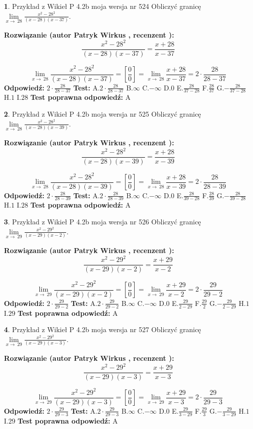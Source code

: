 \documentclass[12pt, a4paper]{article}
\theoremstyle{definition} %
\newtheorem{zad}{}
\newcommand{\zadStart}[1]{\begin{zad}#1\newline}
\newcommand{\zadStop}{\end{zad}}
\newcommand{\rozwStart}[2]{\noindent \textbf{Rozwiązanie (autor #1 , recenzent #2): }\newline}
\newcommand{\rozwStop}{\newline}
\newcommand{\odpStart}{\noindent \textbf{Odpowiedź:}\newline}
\newcommand{\odpStop}{\newline}
\newcommand{\testStart}{\noindent \textbf{Test:}\newline}
\newcommand{\testStop}{\newline}
\newcommand{\kluczStart}{\noindent \textbf{Test poprawna odpowiedź:}\newline}
\newcommand{\kluczStop}{\newline}
\begin{document}
\zadStart{Przykład z Wikieł P 4.2b moja wersja nr 524}
Obliczyć granicę $\lim\limits_{x\to\ 28}\frac{x^{2}-28^{2}}{(x-28)(x-37)}$.
\zadStop
\rozwStart{Patryk Wirkus}{}
$$\frac{x^{2}-28^{2}}{(x-28)(x-37)}=\frac{x+28}{x-37}$$

$$\lim\limits_{x\to\ 28}\frac{x^{2}-28^{2}}{(x-28)(x-37)}=[\frac{0}{0}]=\lim\limits_{x\to\ 28}\frac{x+28}{x-37}=2 \cdot \frac{28}{28-37}$$
\rozwStop
\odpStart
$2 \cdot \frac{28}{28-37}$
\odpStop
\testStart
A.$2 \cdot \frac{28}{28-37}$
B.$\infty$
C.$-\infty$
D.$0$
E.$\frac{28}{37-28}$
F.$\frac{28}{37}$
G.$-\frac{28}{37-28}$
H.$1$
I.$28$
\testStop
\kluczStart
A
\kluczStop



\zadStart{Przykład z Wikieł P 4.2b moja wersja nr 525}
Obliczyć granicę $\lim\limits_{x\to\ 28}\frac{x^{2}-28^{2}}{(x-28)(x-39)}$.
\zadStop
\rozwStart{Patryk Wirkus}{}
$$\frac{x^{2}-28^{2}}{(x-28)(x-39)}=\frac{x+28}{x-39}$$

$$\lim\limits_{x\to\ 28}\frac{x^{2}-28^{2}}{(x-28)(x-39)}=[\frac{0}{0}]=\lim\limits_{x\to\ 28}\frac{x+28}{x-39}=2 \cdot \frac{28}{28-39}$$
\rozwStop
\odpStart
$2 \cdot \frac{28}{28-39}$
\odpStop
\testStart
A.$2 \cdot \frac{28}{28-39}$
B.$\infty$
C.$-\infty$
D.$0$
E.$\frac{28}{39-28}$
F.$\frac{28}{39}$
G.$-\frac{28}{39-28}$
H.$1$
I.$28$
\testStop
\kluczStart
A
\kluczStop



\zadStart{Przykład z Wikieł P 4.2b moja wersja nr 526}
Obliczyć granicę $\lim\limits_{x\to\ 29}\frac{x^{2}-29^{2}}{(x-29)(x-2)}$.
\zadStop
\rozwStart{Patryk Wirkus}{}
$$\frac{x^{2}-29^{2}}{(x-29)(x-2)}=\frac{x+29}{x-2}$$

$$\lim\limits_{x\to\ 29}\frac{x^{2}-29^{2}}{(x-29)(x-2)}=[\frac{0}{0}]=\lim\limits_{x\to\ 29}\frac{x+29}{x-2}=2 \cdot \frac{29}{29-2}$$
\rozwStop
\odpStart
$2 \cdot \frac{29}{29-2}$
\odpStop
\testStart
A.$2 \cdot \frac{29}{29-2}$
B.$\infty$
C.$-\infty$
D.$0$
E.$\frac{29}{2-29}$
F.$\frac{29}{2}$
G.$-\frac{29}{2-29}$
H.$1$
I.$29$
\testStop
\kluczStart
A
\kluczStop



\zadStart{Przykład z Wikieł P 4.2b moja wersja nr 527}
Obliczyć granicę $\lim\limits_{x\to\ 29}\frac{x^{2}-29^{2}}{(x-29)(x-3)}$.
\zadStop
\rozwStart{Patryk Wirkus}{}
$$\frac{x^{2}-29^{2}}{(x-29)(x-3)}=\frac{x+29}{x-3}$$

$$\lim\limits_{x\to\ 29}\frac{x^{2}-29^{2}}{(x-29)(x-3)}=[\frac{0}{0}]=\lim\limits_{x\to\ 29}\frac{x+29}{x-3}=2 \cdot \frac{29}{29-3}$$
\rozwStop
\odpStart
$2 \cdot \frac{29}{29-3}$
\odpStop
\testStart
A.$2 \cdot \frac{29}{29-3}$
B.$\infty$
C.$-\infty$
D.$0$
E.$\frac{29}{3-29}$
F.$\frac{29}{3}$
G.$-\frac{29}{3-29}$
H.$1$
I.$29$
\testStop
\kluczStart
A
\kluczStop
\end{document}

